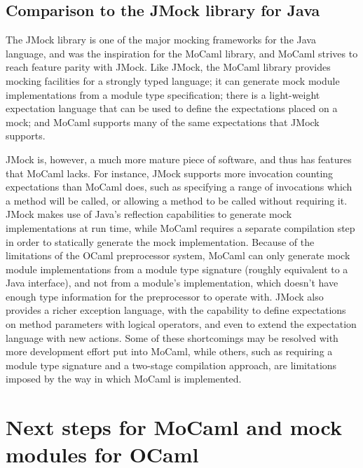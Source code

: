 \subsection{Comparison to the JMock library for Java}


The JMock library \cite{freeman:evolving} \cite{freeman:growing}
\cite{www:jmock} is one of the major mocking frameworks for the Java
language, and was the inspiration for the MoCaml library, and MoCaml
strives to reach feature parity with JMock. Like JMock, the MoCaml
library provides mocking facilities for a strongly typed language; it
can generate mock module implementations from a module type
specification; there is a light-weight expectation language that can
be used to define the expectations placed on a mock; and MoCaml
supports many of the same expectations that JMock supports.


JMock is, however, a much more mature piece of software, and thus has
features that MoCaml lacks. For instance, JMock supports more
invocation counting expectations than MoCaml does, such as specifying
a range of invocations which a method will be called, or allowing a
method to be called without requiring it. JMock makes use of Java's
reflection capabilities to generate mock implementations at run time,
while MoCaml requires a separate compilation step in order to
statically generate the mock implementation. Because of the
limitations of the OCaml preprocessor system, MoCaml can only generate
mock module implementations from a module type signature (roughly
equivalent to a Java interface), and not from a module's
implementation, which doesn't have enough type information for the
preprocessor to operate with. JMock also provides a richer exception
language, with the capability to define expectations on method
parameters with logical operators, and even to extend the expectation
language with new actions. Some of these shortcomings may be resolved
with more development effort put into MoCaml, while others, such as
requiring a module type signature and a two-stage compilation
approach, are limitations imposed by the way in which MoCaml is
implemented.

\section{Next steps for MoCaml and mock modules for OCaml}

